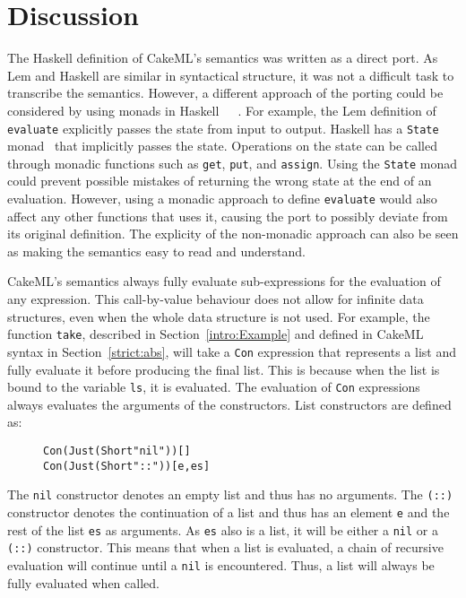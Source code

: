 \section{Discussion}
The Haskell definition of CakeML's semantics was written as a direct port. 
As Lem and
Haskell are similar in syntactical structure, it was not a difficult 
task to transcribe the semantics. However, a different approach of the porting
could be considered by using monads in
Haskell~\cite{MonadHas66:online}~\cite{AllAbout63:online}~\cite{learnhaskell}.
For example, the Lem definition of \texttt{evaluate} explicitly passes the state
from input to output. Haskell has a \texttt{State} monad~\cite{StateMon99:online}
that implicitly passes the state. Operations on the state can be called through
monadic functions such as \texttt{get}, \texttt{put}, and \texttt{assign}.
Using the \texttt{State} monad could prevent possible mistakes of returning the
wrong state at the end of an evaluation. However, using a monadic approach to
define \texttt{evaluate} would also affect any other functions that uses it,
causing the port to possibly deviate from its original definition.
The explicity of the non-monadic approach can also be seen as making the
semantics easy  to read and understand.

CakeML's semantics always fully evaluate sub-expressions for the evaluation 
of any expression. This call-by-value behaviour does not allow for infinite
data structures, even when the whole data structure is not used. For example,
the function \texttt{take}, described in Section~\ref{intro:Example} and defined
in CakeML syntax in Section~\ref{strict:abs}, will take a \texttt{Con}
expression that represents a list and fully evaluate it before producing the
final list. This is because when the list is bound to the variable \texttt{ls},
it is evaluated. The evaluation of \texttt{Con} expressions always evaluates the
arguments of the constructors. List constructors are defined as:
\begin{figure}[H]
\begin{alltt}
  Con (Just (Short "nil")) []
  Con (Just (Short "::" )) [e,es]
\end{alltt}
\end{figure}
\noindent The \texttt{nil} constructor denotes an empty list and thus has no arguments.
The \texttt{(::)} constructor denotes the continuation of a list and thus has
an element \texttt{e} and the rest of the list \texttt{es} as arguments.
As \texttt{es} also is a list, it will be either a \texttt{nil} or a
\texttt{(::)} constructor. This means that when a list is evaluated, a chain
of recursive evaluation will continue until a \texttt{nil} is encountered.
Thus, a list will always be fully evaluated when called.
